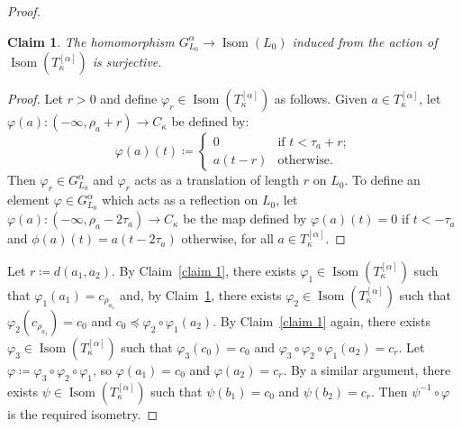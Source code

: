 \documentclass[11pt]{article}
\DeclareMathOperator{\Isom}{Isom}
\newtheorem{claim}{Claim}
\theoremstyle{definition}
\theoremstyle{remark}
\begin{document}
\begin{proof}
    \begin{claim} \label{Claim 2}
        The homomorphism $G^\alpha_{L_0} \rightarrow \Isom(L_0)$ induced from the action of $\Isom(T_\kappa^{[\alpha]})$ is surjective.
    \end{claim}
    \begin{proof}
    \renewcommand{\qedsymbol}{$\blacksquare$}
        Let $r > 0$ and define $\varphi_r \in \Isom(T_\kappa^{[\alpha]})$ as follows. Given $a \in T_\kappa^{[\alpha]}$, let $\varphi(a):(-\infty, \rho_a + r) \rightarrow C_\kappa$ be defined by:
        \[ 
        	\varphi(a)(t) \coloneqq
        	\begin{cases}
        		0 \quad &\text{if } t < \tau_a + r; \\
        		a(t-r) &\text{otherwise.}
        	\end{cases}
        \]
        Then $\varphi_r \in G^\alpha_{L_0}$ and $\varphi_r$ acts as a translation of length $r$ on $L_0$.
        To define an element $\varphi \in G^\alpha_{L_0}$ which acts as a reflection on $L_0$, let $\varphi(a): (-\infty, \rho_a - 2\tau_a) \rightarrow C_\kappa$  be the map defined by $\varphi(a)(t) = 0$ if $t < -\tau_a$ and $\phi(a)(t) = a(t - 2\tau_a)$ otherwise, for all $a \in T_\kappa^{[\alpha]}$.
    \end{proof}

    Let $r \coloneqq d(a_1, a_2)$. By Claim~\ref{claim 1}, there exists $\varphi_1 \in \Isom(T_\kappa^{[\alpha]})$ such that $\varphi_1(a_1) = c_{\rho_{a_1}}$ and, by Claim~\ref{Claim 2}, there exists $\varphi_2 \in \Isom(T_\kappa^{[\alpha]})$ such that $\varphi_2(c_{\rho_{a_1}}) = c_0$ and $c_0 \preceq \varphi_2 \circ \varphi_1(a_2)$. By Claim~\ref{claim 1} again, there exists $\varphi_3 \in \Isom(T_\kappa^{[\alpha]})$ such that $\varphi_3(c_0) = c_0$ and $\varphi_3 \circ \varphi_2 \circ \varphi_1 (a_2) = c_r$. Let $\varphi \coloneqq \varphi_3 \circ \varphi_2 \circ \varphi_1$, so $\varphi(a_1) = c_0$ and $\varphi(a_2) = c_r$. By a similar argument, there exists $\psi \in \Isom(T_\kappa^{[\alpha]})$ such that $\psi(b_1) = c_0$ and $\psi(b_2) = c_r$. Then $\psi^{-1} \circ \varphi$ is the required isometry.
\end{proof}
\end{document}
